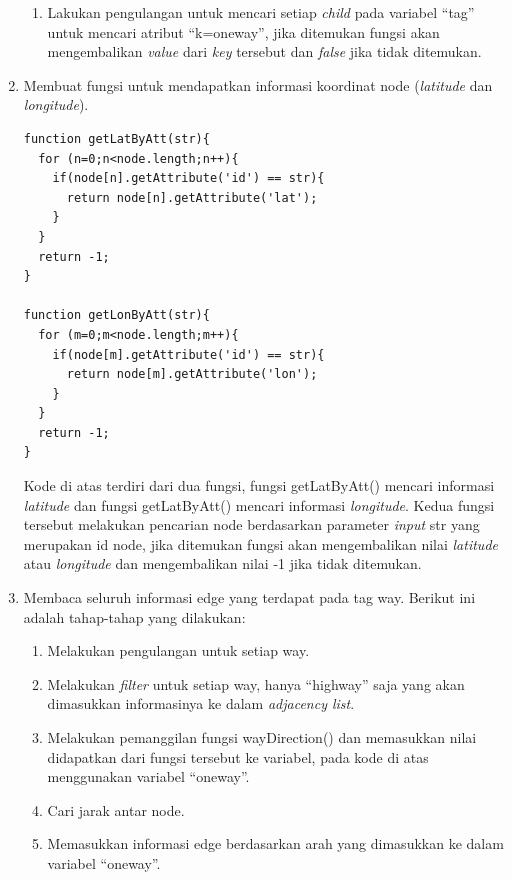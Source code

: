 \begin{enumerate}
\begin{enumerate}
  \item Lakukan pengulangan untuk mencari setiap \textit{child} pada variabel
  ``tag'' untuk mencari atribut ``k=oneway'', jika ditemukan fungsi akan
  mengembalikan \textit{value} dari \textit{key} tersebut dan \textit{false}
  jika tidak ditemukan.
  \end{enumerate}

  \item Membuat fungsi untuk mendapatkan informasi koordinat node
  (\textit{latitude} dan \textit{longitude}).
\begin{verbatim}
function getLatByAtt(str){
  for (n=0;n<node.length;n++){
    if(node[n].getAttribute('id') == str){
      return node[n].getAttribute('lat');
    }
  }
  return -1;
}

function getLonByAtt(str){
  for (m=0;m<node.length;m++){
    if(node[m].getAttribute('id') == str){
      return node[m].getAttribute('lon');
    }
  }
  return -1;
}
\end{verbatim}
  Kode di atas terdiri dari dua fungsi, fungsi getLatByAtt() mencari informasi
  \textit{latitude} dan fungsi getLatByAtt() mencari informasi
  \textit{longitude}. Kedua fungsi tersebut melakukan pencarian node berdasarkan
  parameter \textit{input} str yang merupakan id node, jika ditemukan fungsi
  akan mengembalikan nilai \textit{latitude} atau \textit{longitude} dan
  mengembalikan nilai -1 jika tidak ditemukan.

  \item Membaca seluruh informasi edge yang terdapat pada tag way. Berikut ini
  adalah tahap-tahap yang dilakukan:
  \begin{enumerate}
    \item Melakukan pengulangan untuk setiap way.
    
    \item Melakukan \textit{filter} untuk setiap way, hanya ``highway'' saja
    yang akan dimasukkan informasinya ke dalam \textit{adjacency list}.
    
    \item Melakukan pemanggilan fungsi wayDirection() dan memasukkan nilai
    didapatkan dari fungsi tersebut ke variabel, pada kode di atas menggunakan
    variabel ``oneway''.
    
    \item Cari jarak antar node.
    
    \item Memasukkan informasi edge berdasarkan arah yang dimasukkan ke dalam
    variabel ``oneway''.
  \end{enumerate}


\end{enumerate}
